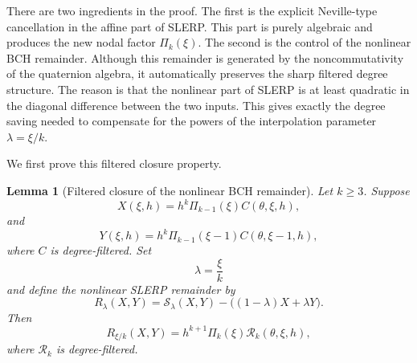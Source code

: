 \documentclass[a4paper,11pt]{article}
\numberwithin{equation}{section}
\theoremstyle{plain}
\newtheorem{lemma}[thm]{Lemma}
\theoremstyle{definition}
\theoremstyle{remark}
\begin{document}
There are two ingredients in the proof.  The first is the explicit
Neville-type cancellation in the affine part of SLERP.  This part is purely
algebraic and produces the new nodal factor \(\Pi_k(\xi)\).  The second is the
control of the nonlinear BCH remainder.  Although this remainder is generated
by the noncommutativity of the quaternion algebra, it automatically preserves
the sharp filtered degree structure.  The reason is that the nonlinear part of
SLERP is at least quadratic in the diagonal difference between the two inputs.
This gives exactly the degree saving needed to compensate for the powers of
the interpolation parameter \(\lambda=\xi/k\).

We first prove this filtered closure property.

\begin{lemma}[Filtered closure of the nonlinear BCH remainder]
\label{lem:filtered_bch_closure}
Let \(k\geq3\).  Suppose
\[
        X(\xi,h)
        =
        h^k\Pi_{k-1}(\xi)C(\theta,\xi,h),
\]
and
\[
        Y(\xi,h)
        =
        h^k\Pi_{k-1}(\xi-1)C(\theta,\xi-1,h),
\]
where \(C\) is degree-filtered.  Set
\[
        \lambda=\frac{\xi}{k}
\]
and define the nonlinear SLERP remainder by
\[
        R_\lambda(X,Y)
        =
        \mathcal S_\lambda(X,Y)
        -
        \bigl((1-\lambda)X+\lambda Y\bigr).
\]
Then
\[
        R_{\xi/k}(X,Y)
        =
        h^{k+1}\Pi_k(\xi)\mathcal R_k(\theta,\xi,h),
\]
where \(\mathcal R_k\) is degree-filtered.
\end{lemma}
\end{document}
